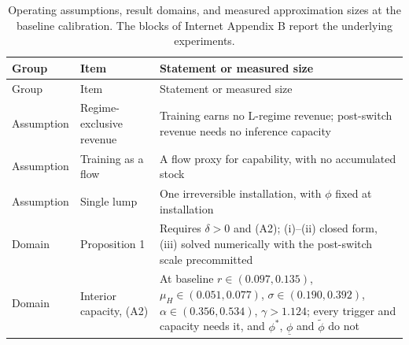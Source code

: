 \documentclass[
  11pt,
  letterpaper,
]{scrartcl}
\begin{document}
\begin{longtable}[]{@{}
  >{\raggedright\arraybackslash}p{}
  >{\raggedright\arraybackslash}p{}
  >{\raggedright\arraybackslash}p{}@{}}
\caption{Operating assumptions, result domains, and measured
approximation sizes at the baseline calibration. The blocks of Internet
Appendix B report the underlying
experiments.}\label{tbl-domains}\tabularnewline
\toprule\noalign{}
\begin{minipage}[b]{\linewidth}\raggedright
Group
\end{minipage} & \begin{minipage}[b]{\linewidth}\raggedright
Item
\end{minipage} & \begin{minipage}[b]{\linewidth}\raggedright
Statement or measured size
\end{minipage} \\
\midrule\noalign{}
\endfirsthead
\toprule\noalign{}
\begin{minipage}[b]{\linewidth}\raggedright
Group
\end{minipage} & \begin{minipage}[b]{\linewidth}\raggedright
Item
\end{minipage} & \begin{minipage}[b]{\linewidth}\raggedright
Statement or measured size
\end{minipage} \\
\midrule\noalign{}
\endhead
\bottomrule\noalign{}
\endlastfoot
Assumption & Regime-exclusive revenue & Training earns no L-regime
revenue; post-switch revenue needs no inference capacity \\
Assumption & Training as a flow & A flow proxy for capability, with no
accumulated stock \\
Assumption & Single lump & One irreversible installation, with \(\phi\)
fixed at installation \\
Domain & Proposition 1 & Requires \(\delta > 0\) and (A2); (i)--(ii)
closed form, (iii) solved numerically with the post-switch scale
precommitted \\
Domain & Interior capacity, (A2) & At baseline \(r \in (0.097, 0.135)\),
\(\mu_H \in (0.051, 0.077)\), \(\sigma \in (0.190, 0.392)\),
\(\alpha \in (0.356, 0.534)\), \(\gamma > 1.124\); every trigger and
capacity needs it, and \(\phi^*\), \(\underline{\phi}\) and
\(\tilde{\phi}\) do not \\

\end{longtable}
\end{document}
